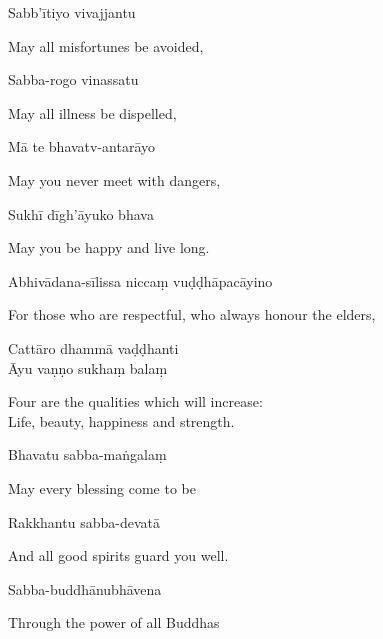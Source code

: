
Sabb'ītiyo vivajjantu

\begin{cprenglish}
  May all misfortunes be avoided,
\end{cprenglish}

Sabba-rogo vinassatu

\begin{cprenglish}
  May all illness be dispelled,
\end{cprenglish}

Mā te bhavatv-antarāyo

\begin{cprenglish}
  May you never meet with dangers,
\end{cprenglish}

Sukhī dīgh'āyuko bhava

\begin{cprenglish}
  May you be happy and live long.
\end{cprenglish}

Abhivādana-sīlissa niccaṃ vuḍḍhāpacāyino

\begin{cprenglish}
  For those who are respectful, who always honour the elders,
\end{cprenglish}

Cattāro dhammā vaḍḍhanti\\
Āyu vaṇṇo sukhaṃ balaṃ

\begin{cprenglish}
  Four are the qualities which will increase:\\
  Life, beauty, happiness and strength.\\
\end{cprenglish}


Bhavatu sabba-maṅgalaṃ

\begin{cprenglish}
  May every blessing come to be
\end{cprenglish}

Rakkhantu sabba-devatā

\begin{cprenglish}
  And all good spirits guard you well.
\end{cprenglish}

Sabba-buddhānubhāvena

\begin{cprenglish}
  Through the power of all Buddhas
\end{cprenglish}

